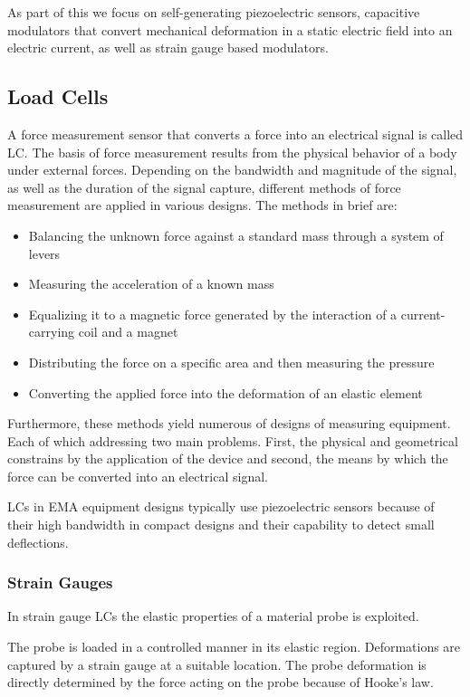 As part of this we focus on self-generating piezoelectric sensors, capacitive modulators that convert mechanical deformation in a static electric field into an electric current, as well as strain gauge based modulators.

\subsection{Load Cells}

A force measurement sensor that converts a force into an electrical signal is called \acf{LC}. The basis of force measurement results from the physical behavior of a body under external forces. Depending on the bandwidth and magnitude of the signal, as well as the duration of the signal capture, different methods of force measurement are applied in various designs. The methods in brief are:

\begin{itemize}
  \item Balancing the unknown force against a standard mass through a system of levers
  \item Measuring the acceleration of a known mass
  \item Equalizing it to a magnetic force generated by the interaction of a current-carrying coil and a magnet
  \item Distributing the force on a specific area and then measuring the pressure
  \item Converting the applied force into the deformation of an elastic element
\end{itemize}

Furthermore, these methods yield numerous of designs of measuring equipment. Each of which addressing two main problems. First, the physical and geometrical constrains by the application of the device and second, the means by which the force can be converted into an electrical signal.

\ac{LC}s in \ac{EMA} equipment designs typically use piezoelectric sensors because of their high bandwidth in compact designs and their capability to detect small deflections.

\subsubsection{Strain Gauges}

In strain gauge \ac{LC}s the elastic properties of a material probe is exploited.

The probe is loaded in a controlled manner in its elastic region. Deformations are captured by a strain gauge at a suitable location. The probe deformation is directly determined by the force acting on the probe because of Hooke's law.

